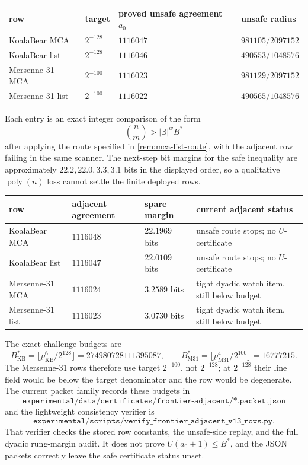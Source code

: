 \documentclass[a4paper,11pt]{amsart}
\theoremstyle{remark}
\newcommand{\B}{\mathbb B}
\newcommand{\poly}{\operatorname{poly}}
\begin{document}
\begin{center}
\begin{tabular}{@{}llll@{}}
\toprule
row & target & proved unsafe agreement \(a_0\) & unsafe radius\\
\midrule
KoalaBear MCA & \(2^{-128}\) & \(1116047\) & \(981105/2097152\)\\
KoalaBear list & \(2^{-128}\) & \(1116046\) & \(490553/1048576\)\\
Mersenne-31 MCA & \(2^{-100}\) & \(1116023\) & \(981129/2097152\)\\
Mersenne-31 list & \(2^{-100}\) & \(1116022\) & \(490565/1048576\)\\
\bottomrule
\end{tabular}
\end{center}

Each entry is an exact integer comparison of the form
\[
        \binom{n}{m}>|\B|^w B^*
\]
after applying the route specified in \cref{rem:mca-list-route}, with the adjacent row failing in the same scanner.  The next-step bit margins for the safe inequality are approximately \(22.2,22.0,3.3,3.1\) bits in the displayed order, so a qualitative \(\poly(n)\) loss cannot settle the finite deployed rows.

\begin{center}\footnotesize
\begin{tabular}{@{}llll@{}}
\toprule
row & adjacent agreement & spare margin & current adjacent status\\
\midrule
KoalaBear MCA & \(1116048\) & \(22.1969\) bits & unsafe route stops; no \(U\)-certificate\\
KoalaBear list & \(1116047\) & \(22.0109\) bits & unsafe route stops; no \(U\)-certificate\\
Mersenne-31 MCA & \(1116024\) & \(3.2589\) bits & tight dyadic watch item, still below budget\\
Mersenne-31 list & \(1116023\) & \(3.0730\) bits & tight dyadic watch item, still below budget\\
\bottomrule
\end{tabular}
\end{center}

The exact challenge budgets are
\[
        B^*_{\mathrm{KB}}=\bigl\lfloor p_{\mathrm{KB}}^6/2^{128}\bigr\rfloor
        =274980728111395087,
        \qquad
        B^*_{\mathrm{M31}}=\bigl\lfloor p_{\mathrm{M31}}^4/2^{100}\bigr\rfloor
        =16777215.
\]
The Mersenne-31 rows therefore use target \(2^{-100}\), not \(2^{-128}\); at \(2^{-128}\) their line field would be below the target denominator and the row would be degenerate.  The current packet family records these budgets in
\[
\texttt{experimental/data/certificates/frontier-adjacent/*.packet.json}
\]
and the lightweight consistency verifier is
\[
\texttt{experimental/scripts/verify\_frontier\_adjacent\_v13\_rows.py}.
\]
That verifier checks the stored row constants, the unsafe-side replay, and the full dyadic rung-margin audit.  It does not prove \(U(a_0+1)\le B^*\), and the JSON packets correctly leave the safe certificate status unset.
\end{document}
